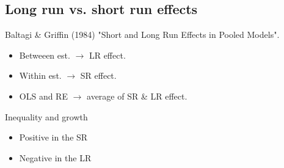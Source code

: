 \begin{multicols}{2}
\subsection{Long run vs. short run effects} %
Baltagi \& Griffin (1984) "Short and Long Run Effects in Pooled Models".
\begin{itemize}
  \item Betweeen est. $\rightarrow$ LR effect.
  \item Within est. $\rightarrow$ SR effect.
  \item OLS and RE $\rightarrow$ average of SR \& LR effect.
\end{itemize}
Inequality and growth
\begin{itemize}
  \item Positive in the SR
  \item Negative in the LR
\end{itemize}


\end{multicols}


